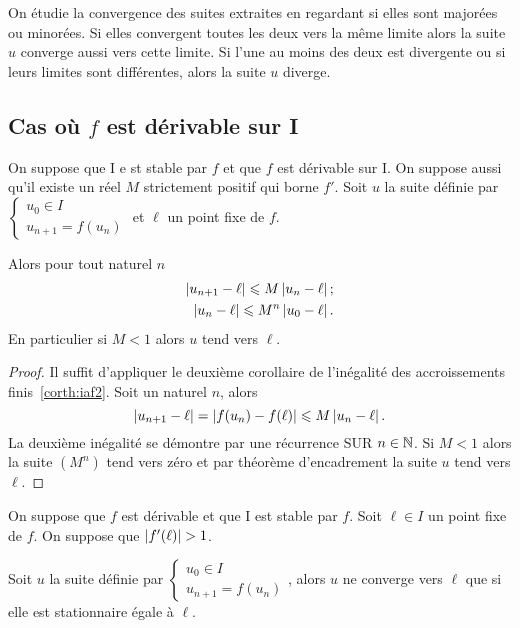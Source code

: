 On étudie la convergence des suites extraites en regardant si elles sont majorées ou minorées. Si elles convergent toutes les deux vers la même limite alors la suite $u$ converge aussi vers cette limite. Si l'une au moins des deux est divergente ou si leurs limites sont différentes, alors la suite $u$ diverge.

\subsection{Cas où $f$ est dérivable sur I}

\begin{prop}
  On suppose que I e st stable par $f$ et que $f$ est dérivable sur I. On suppose aussi qu'il existe un réel $M$ strictement positif qui borne $f'$. Soit $u$ la suite définie par $\begin{cases} u_0 \in I \\ u_{n+1}=f(u_n) \end{cases}$ et $\ell$ un point fixe de $f$.

  Alors pour tout naturel $n$
  \begin{align}
    \left\lvert u_{n+1}-\ell\right\rvert \leqslant M \left\lvert u_n-\ell\right\rvert; \\
    \left\lvert u_n-\ell\right\rvert \leqslant M^n \left\lvert u_0-\ell\right\rvert.
  \end{align}
  En particulier si $M < 1$ alors $u$ tend vers $\ell$.
\end{prop}
\begin{proof}
  Il suffit d'appliquer le deuxième corollaire de l'inégalité des accroissements finis~\ref{corth:iaf2}. Soit un naturel $n$, alors
  \begin{equation}
    \left\lvert u_{n+1}-\ell\right\rvert=\left\lvert f(u_n)-f(\ell)\right\rvert \leqslant M \left\lvert u_n-\ell\right\rvert.
  \end{equation}
  La deuxième inégalité se démontre par une récurrence SUR $n \in \mathbb{N}$. Si $M<1$ alors la suite $(M^n)$ tend vers zéro et par théorème d'encadrement la suite $u$ tend vers $\ell$.
\end{proof}
\begin{prop}
  On suppose que $f$ est dérivable et que I est stable par $f$. Soit $\ell \in I$ un point fixe de $f$. On suppose que $\left\lvert f'(\ell)\right\rvert>1$.

  Soit $u$ la suite définie par $\begin{cases} u_0 \in I \\ u_{n+1}=f(u_n) \end{cases}$, alors $u$ ne converge vers $\ell$ que si elle est stationnaire égale à $\ell$.
\end{prop}
